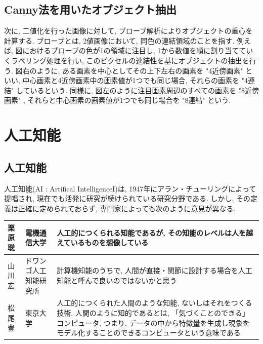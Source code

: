 \documentclass{suribt}
\begin{document}
\section{Canny法を用いたオブジェクト抽出}
次に, 二値化を行った画像に対して, ブローブ解析によりオブジェクトの重心を計算する. ブローブとは, 2値画像において, 同色の連結領域のことを指す. 例えば, 図におけるブローブの色が1の領域に注目し, 1から数値を順に割り当てていくラベリング処理を行い, このピクセルの連結性を基にオブジェクトの抽出を行う. 図右のように, ある画素を中心としてその上下左右の画素を "4近傍画素" といい, 中心画素と4近傍画素中の画素値が1つでも同じ場合, それらの画素を "4連結" しているという. 同様に, 図左のように注目画素周辺のすべての画素を "8近傍画素" , それらと中心画素の画素値が1つでも同じ場合を "8連結" という. 


\chapter{人工知能}

\section{人工知能}
人工知能(AI : Artifical IntelligenceI)は, 1947年にアラン・チューリングによって提唱され, 現在でも活発に研究が続けられている研究分野である. しかし, その定義は正確に定められておらず, 専門家によっても次のように意見が異なる.
\begin{table}[htb]
	\begin{tabular}{l|l|p{7cm}}
		\hline
		栗原聡 & 電機通信大学 & 人工的につくられる知能であるが, その知能のレベルは人を越えているものを想像している \\ \hline
		山川宏 & ドワンゴ人工知能研究所 & 計算機知能のうちで, 人間が直接・関節に設計する場合を人工知能と呼んで良いのではないかと思う \\ \hline
		松尾豊 & 東京大学 & 人工的につくられた人間のような知能, ないしはそれをつくる技術. 人間のように知的であるとは, 「気づくことのできる」コンピュータ, つまり, データの中から特徴量を生成し現象をモデル化することのできるコンピュータという意味である \\
		\hline
	\end{tabular}
\end{table}
\end{document}
